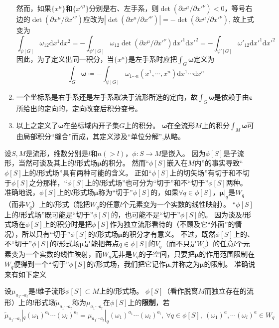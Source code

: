 \begin{note}
\begin{enumerate}[（1）]
        然而，如果$\{x^\mu\}$和$\{x'^\mu\}$分别是右、左手系，则$\det(\partial x^\mu / \partial x'^\nu) < 0$，等号右边的$\det(\partial x^\mu / \partial x'^\nu)$应改为$|\det(\partial x^\mu / \partial x'^\nu)| = -\det(\partial x^\mu / \partial x'^\nu)$, 故上式变为
        $$\int_{\psi[G]}\omega_{12}\mathrm{d}x^1\mathrm{d}x^2 = -\int_{\psi'[G]}\omega_{12}\det(\partial x^\mu / \partial x'^\nu)\mathrm{d}x'^1\mathrm{d}x'^2 = -\int_{\psi'[G]}\omega'_{12}\mathrm{d}x'^1\mathrm{d}x'^2$$
        因此，为了定义出同一积分，当$\{x^\mu\}$是左手系时应把$\displaystyle\int_G\bm\omega$定义为
        $$\int_G\bm\omega \coloneq -\int_{\psi[G]}\omega_{1 \cdots n}(x^1, \cdots, x^n)\mathrm{d}x^1 \cdots \mathrm{d}x^n$$
        \item 一个坐标系是右手系还是左手系取决于流形所选的定向，故$\displaystyle\int_G\bm\omega$是依赖于由$\bm\varepsilon$所给出的定向的，定向改变后积分变号。
        \item 以上之定义了$\bm\omega$在坐标域内开子集$G$上的积分。
        $\bm\omega$在全流形$M$上的积分$\displaystyle\int_M\bm\omega$可由局部积分``缝合''而成，其定义涉及``单位分解'',从略。
    \end{enumerate}
\end{note}

设$S, M$是流形，维数分别是$l$和$n(>l)$，$\phi \colon S \to M$是嵌入。
因为$\phi[S]$是子流形，当然可谈及其上的$l$形式场$\bm\mu$的积分。
然而``$\phi[S]$嵌入在$M$内''的事实导致``$\phi[S]$上的$l$形式场''具有两种可能的含义。
正如``$\phi[S]$上的切矢场''有切于和不切于$\phi[S]$之分那样，``$\phi[S]$上的$l$形式场''也可分为``切于''和不``切于''$\phi[S]$两种。
准确地说，$\phi[S]$上的$l$形式场$\bm\mu$称为``切于''$\phi[S]$的，如果$\forall q \in \phi[S]$，$\bm\mu|_q$是$W_q$（而非$V_q$）上的$l$形式（能把$W_q$的任意$l$个元素变为一个实数的线性映射）。
``$\phi[S]$上的$l$形式场''既可能是``切于''$\phi[S]$的，也可能不是``切于''$\phi[S]$的。
因为谈及$l$形式场在$\phi[S]$上的积分时是把$\phi[S]$作为独立流形看待的（不顾及它``外面''的情况），所以只有``切于''$\phi[S]$的$l$形式场$\bm\mu$的积分才有意义。
不过，既然$\phi[S]$上的、不``切于''$\phi[S]$的$l$形式场$\bm\mu$是能把每点$q \in \phi[S]$的$V_q$（而不只是$W_q$）的任意$l$个元素变为一个实数的线性映射，而$W_q$无非是$V_q$的子空间，只要把$\bm\mu$的作用范围限制在$W_q$便得到一个``切于''$\phi[S]$的$l$形式场，我们把它记作$\bm{\tilde\mu}$,并称之为$\bm\mu$的限制。
准确说来有如下定义

\begin{definition}
    设$\mu_{a_1 \cdots a_l}$是$l$维子流形$\phi[S] \subset M$上的$l$形式场。
    $\phi[S]$（看作脱离$M$而独立存在的流形）上的$l$形式场$\tilde\mu_{a_1 \cdots a_l}$称为$\mu_{a_1 \cdots a_l}$在$\phi[S]$上的\textbf{限制}，若
    $$\tilde\mu_{a_1 \cdots a_l}|_q(\omega_1)^{a_1} \cdots (\omega_l)^{a_l} = \mu_{a_1 \cdots a_l}|_q(\omega_1)^{a_1} \cdots (\omega_l)^{a_l}, ~ \forall q \in \phi[S], ~ (\omega_1)^a, \cdots (\omega_l)^a \in W_q$$
\end{definition}

